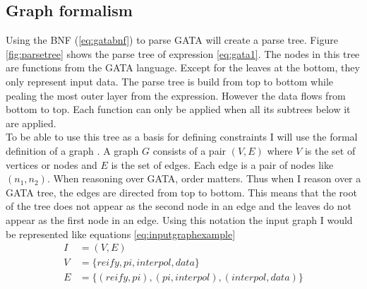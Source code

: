\documentclass{article}
\begin{document}
\subsection{Graph formalism}
Using the BNF (\ref{eq:gatabnf}) to parse GATA will create a parse tree. Figure \ref{fig:parsetree} shows the parse tree of expression \ref{eq:gata1}. The nodes in this tree are functions from the GATA language. Except for the leaves at the bottom, they only represent input data. The parse tree is build from top to bottom while pealing the most outer layer from the expression. However the data flows from bottom to top. Each function can only be applied when all its subtrees below it are applied. 
\\

To be able to use this tree as a basis for defining constraints I will use the formal definition of a graph \cite{trudeau2013introduction}.  A graph $G$ consists of a pair $(V,E)$ where $V$ is the set of vertices or nodes and $E$ is the set of edges. Each edge is a pair of nodes like $(n_1, n_2)$. When reasoning over GATA, order matters. Thus when I reason over a GATA tree, the edges are directed from top to bottom. This means that the root of the tree does not appear as the second node in an edge and the leaves do not appear as the first node in an edge. 
Using this notation the input graph I would be represented like equations \ref{eq:inputgraphexample}
 \begin{align}
     I &= (V,E) \nonumber \\
     V &= \{reify,pi,interpol, data\} \nonumber \\
     E &= \{(reify,pi), (pi,interpol), (interpol,data)\} \label{eq:inputgraphexample}
 \end{align}
\\ %



\end{document}

